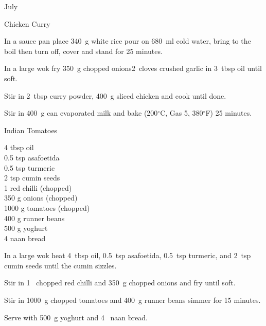 \begin{menu}{July}
\begin{recipe}{2}{Chicken Curry}
\begin{ingredients}
		\end{ingredients}
	
	
	
    \begin{instructions}
    \item 
    In a
    sauce pan
    place
    340~g  white rice
    pour on
    680~ml  cold water,
    bring to the boil then turn off, cover and stand for 25 minutes.
  \item 
        In a large wok fry
        350~g chopped onions2~cloves crushed garlic
        in
        3~tbsp  oil
        until soft.
      \item 
        Stir in
        2~tbsp  curry powder,
        400~g sliced chicken
        and cook until done.
      \item 
        Stir in
        400~g  can evaporated milk
        and
        bake (200$^{\circ}$C, Gas 5, 380$^{\circ}$F) 25 minutes.
      
    \end{instructions}
    \end{recipe}%
  
    \begin{recipe}{2}{Indian Tomatoes}%
		\begin{ingredients}
		4 tbsp oil  \\
	0.5 tsp asafoetida  \\
	0.5 tsp turmeric  \\
	2 tsp cumin seeds  \\
	1  red chilli (chopped) \\
	350 g onions (chopped) \\
	1000 g tomatoes (chopped) \\
	400 g runner beans  \\
	500 g yoghurt  \\
	4  naan bread  \\
	
		\end{ingredients}
	
	
    \begin{instructions}
    \item 
        In a large wok heat
        4~tbsp  oil,
        0.5~tsp  asafoetida,
        0.5~tsp  turmeric,
        and
        2~tsp  cumin seeds
        until
        the cumin sizzles.
      \item 
        Stir in
        1~ chopped red chilli
        and
        350~g chopped onions
        and
        fry until soft.
      \item 
        Stir in
        1000~g chopped tomatoes
        and
        400~g  runner beans
        simmer for 15 minutes.
      \item 
        Serve with
        500~g  yoghurt
        and
        4~  naan bread.
      

\end{instructions}
\end{recipe}
\end{menu}
